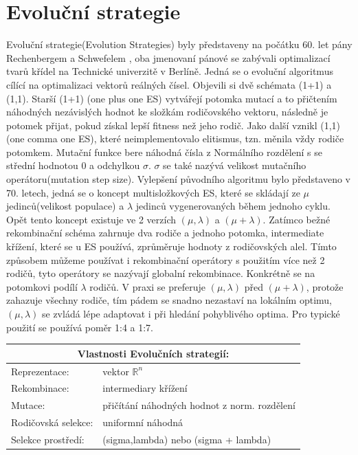 \section{Evoluční strategie}
Evoluční strategie(Evolution Strategies) byly představeny na počátku 60. let pány Rechenbergem a Schwefelem \cite{Beyer2002}, oba jmenovaní pánové se zabývali optimalizací tvarů křídel na Technické univerzitě v Berlíně. Jedná se o evoluční algoritmus cílící na optimalizaci vektorů reálných čísel. Objevili si dvě schémata (1+1) a (1,1). Starší (1+1) (one plus one ES) vytvářejí potomka mutací a to přičtením náhodných nezávislých hodnot ke složkám rodičovského vektoru, následně je potomek přijat, pokud získal lepší fitness než jeho rodič. Jako další vznikl (1,1) (one comma one ES), které neimplementovalo elitismus, tzn. měnila vždy rodiče potomkem. Mutační funkce bere náhodná čísla z Normálního rozdělení s se střední hodnotou 0 a odchylkou $\sigma$. $\sigma$ se také nazývá velikost mutačního operátoru(mutation step size). Vylepšení původního algoritmu bylo představeno v 70. letech, jedná se o koncept multisložkových ES, které se skládají ze $\mu$ jedinců(velikost populace) a $\lambda$ jedinců vygenerovaných během jednoho cyklu. Opět tento koncept existuje ve 2 verzích $(\mu,\lambda)$ a $(\mu + \lambda)$. Zatímco bežné rekombinační schéma zahrnuje dva rodiče a jednoho potomka, intermediate křížení, které se u ES používá, zprůměruje hodnoty z rodičovských alel. Tímto způsobem můžeme používat i rekombinační operátory s použitím více než 2 rodičů, tyto operátory se nazývají globalní rekombinace. Konkrétně se na potomkovi podílí $\lambda$ rodičů. V praxi se preferuje $(\mu,\lambda)$ před $(\mu + \lambda)$, protože zahazuje všechny rodiče, tím pádem se snadno nezastaví na lokálním optimu, $(\mu,\lambda)$ se zvládá lépe adaptovat i při hledání pohyblivého optima. Pro typické použití se používá poměr 1:4 a 1:7. 
\begin{center}
  \begin{tabular}{ l l }
      \multicolumn{2}{c}{Vlastnosti Evolučních strategií:} \\
      \hline \hline
      Reprezentace: & vektor $\mathbb{R}^n$ \\
      \hline  
      Rekombinace: & intermediary křížení \\
      \hline  
      Mutace: & přičítání náhodných hodnot z norm. rozdělení \\
      \hline   
      Rodičovská selekce: & uniformní náhodná \\
      \hline   
      Selekce prostředí: & (sigma,lambda) nebo (sigma + lambda) \\
    \end{tabular} 
  \end{center} \par
